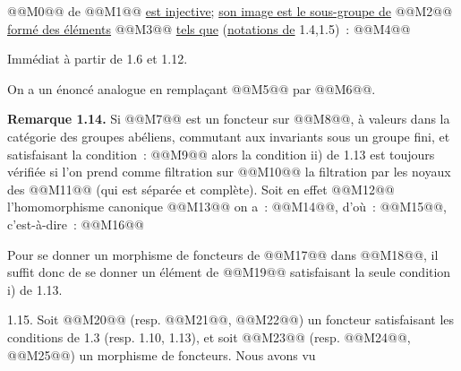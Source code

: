 
@@M0@@ de @@M1@@ \uline{est injective}; \uline{son image est le sous-groupe de} @@M2@@ \uline{formé des éléments} @@M3@@ \uline{tels que} (\uline{notations de} 1.4,1.5)~:
@@M4@@

Immédiat à partir de 1.6 et 1.12.

On a un énoncé analogue en remplaçant @@M5@@ par @@M6@@.

\textbf{Remarque 1.14.} Si @@M7@@ est un foncteur sur @@M8@@, à valeurs dans la catégorie des groupes abéliens, commutant aux invariants sous un groupe fini, et satisfaisant la condition~:
@@M9@@
alors la condition ii) de 1.13 est toujours vérifiée si l'on prend comme filtration sur @@M10@@ la filtration par les noyaux des @@M11@@ (qui est séparée et complète). Soit en effet @@M12@@ l'homomorphisme canonique
@@M13@@
on a~: @@M14@@, d'où~: @@M15@@, c'est-à-dire~:
@@M16@@

Pour se donner un morphisme de foncteurs de @@M17@@ dans @@M18@@, il suffit donc de se donner un élément de @@M19@@ satisfaisant la seule condition i) de 1.13.

1.15. Soit @@M20@@ (resp. @@M21@@, @@M22@@) un foncteur satisfaisant les conditions de 1.3 (resp. 1.10, 1.13), et soit @@M23@@ (resp. @@M24@@, @@M25@@) un morphisme de foncteurs. Nous avons vu 
